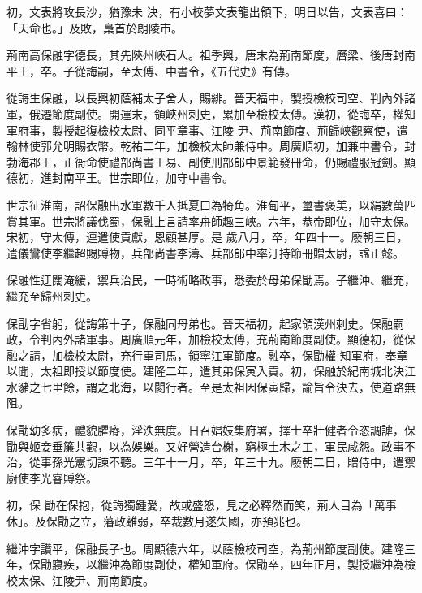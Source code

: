 \begin{pinyinscope}
 初，文表將攻長沙，猶豫未
 決，有小校夢文表龍出領下，明日以告，文表喜曰：「天命也。」及敗，梟首於朗陵市。



 荊南高保融字德長，其先陝州峽石人。祖季興，唐末為荊南節度，曆梁、後唐封南平王，卒。子從誨嗣，至太傅、中書令，《五代史》有傳。



 從誨生保融，以長興初蔭補太子舍人，賜緋。晉天福中，製授檢校司空、判內外諸軍，俄遷節度副使。開運末，領峽州刺史，累加至檢校太傅。漢初，從誨卒，權知軍府事，製授起復檢校太尉、同平章事、江陵
 尹、荊南節度、荊歸峽觀察使，遣翰林使郭允明賜衣幣。乾祐二年，加檢校太師兼侍中。周廣順初，加兼中書令，封勃海郡王，正衙命使禮部尚書王易、副使刑部郎中景範發冊命，仍賜禮服冠劍。顯德初，進封南平王。世宗即位，加守中書令。



 世宗征淮南，詔保融出水軍數千人抵夏口為犄角。淮甸平，璽書褒美，以絹數萬匹賞其軍。世宗將議伐蜀，保融上言請率舟師趣三峽。六年，恭帝即位，加守太保。宋初，守太傅，連遣使貢獻，恩顧甚厚。是
 歲八月，卒，年四十一。廢朝三日，遣儀鸞使李繼超賜賻物，兵部尚書李濤、兵部郎中率汀持節冊贈太尉，諡正懿。



 保融性迂闊淹緩，禦兵治民，一時術略政事，悉委於母弟保勖焉。子繼沖、繼充，繼充至歸州刺史。



 保勖字省躬，從誨第十子，保融同母弟也。晉天福初，起家領漢州刺史。保融嗣政，令判內外諸軍事。周廣順元年，加檢校太傅，充荊南節度副使。顯德初，從保融之請，加檢校太尉，充行軍司馬，領寧江軍節度。融卒，保勖權
 知軍府，奉章以聞，太祖即授以節度使。建隆二年，遣其弟保寅入貢。初，保融於紀南城北決江水瀦之七里餘，謂之北海，以閡行者。至是太祖因保寅歸，諭旨令決去，使道路無阻。



 保勖幼多病，體貌臞瘠，淫泆無度。日召娼妓集府署，擇士卒壯健者令恣調謔，保勖與姬妾垂簾共觀，以為娛樂。又好營造台榭，窮極土木之工，軍民咸怨。政事不治，從事孫光憲切諫不聽。三年十一月，卒，年三十九。廢朝二日，贈侍中，遣禦廚使李光睿賻祭。



 初，保
 勖在保抱，從誨獨鍾愛，故或盛怒，見之必釋然而笑，荊人目為「萬事休」。及保勖之立，藩政離弱，卒裁數月遂失國，亦預兆也。



 繼沖字讚平，保融長子也。周顯德六年，以蔭檢校司空，為荊州節度副使。建隆三年，保勖寢疾，以繼沖為節度副使，權知軍府。保勖卒，四年正月，製授繼沖為檢校太保、江陵尹、荊南節度。




\end{pinyinscope}
